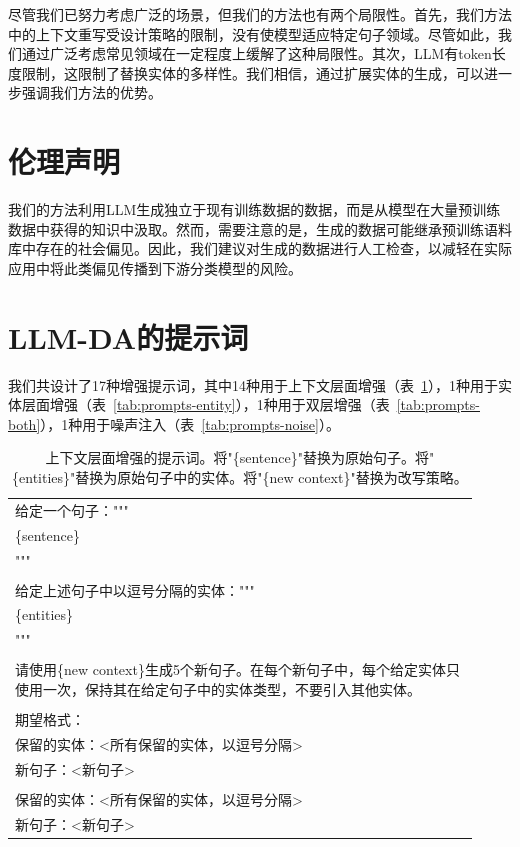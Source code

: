 \documentclass[supercite]{Experimental_Report}
\theoremstyle{definition}
\begin{document}
尽管我们已努力考虑广泛的场景，但我们的方法也有两个局限性。首先，我们方法中的上下文重写受设计策略的限制，没有使模型适应特定句子领域。尽管如此，我们通过广泛考虑常见领域在一定程度上缓解了这种局限性。其次，LLM有token长度限制，这限制了替换实体的多样性。我们相信，通过扩展实体的生成，可以进一步强调我们方法的优势。

\section*{伦理声明}

我们的方法利用LLM生成独立于现有训练数据的数据，而是从模型在大量预训练数据中获得的知识中汲取。然而，需要注意的是，生成的数据可能继承预训练语料库中存在的社会偏见。因此，我们建议对生成的数据进行人工检查，以减轻在实际应用中将此类偏见传播到下游分类模型的风险。



\appendix

\section{LLM-DA的提示词}
\label{appendix:prompts}

我们共设计了17种增强提示词，其中14种用于上下文层面增强（表~\ref{tab:prompts-context}），1种用于实体层面增强（表~\ref{tab:prompts-entity}），1种用于双层增强（表~\ref{tab:prompts-both}），1种用于噪声注入（表~\ref{tab:prompts-noise}）。

\begin{table}[h]
\centering
    \begin{tabular}{m{0.92\linewidth}}
    \toprule
      给定一个句子：""" \\
\{sentence\}\\
"""\\
\\
给定上述句子中以逗号分隔的实体："""\\
\{entities\}\\
"""\\
\\
请使用\{new context\}生成5个新句子。在每个新句子中，每个给定实体只使用一次，保持其在给定句子中的实体类型，不要引入其他实体。\\
\\
期望格式：\\
保留的实体：<所有保留的实体，以逗号分隔>\\
新句子：<新句子>\\
\\
保留的实体：<所有保留的实体，以逗号分隔>\\
新句子：<新句子>
\\ \bottomrule
\end{tabular}
\caption{上下文层面增强的提示词。将"\{sentence\}"替换为原始句子。将"\{entities\}"替换为原始句子中的实体。将"\{new context\}"替换为改写策略。}
\label{tab:prompts-context}
\end{table}
\end{document}
